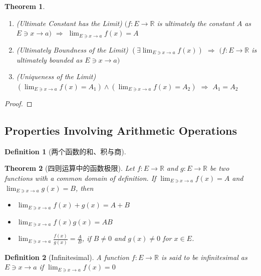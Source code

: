 \documentclass[onecolumn]{ctexart}
\newtheorem{definition}{Definition}
\newtheorem{theorem}{Theorem}
\begin{document}
\begin{theorem}
  \begin{enumerate}
    \item (Ultimate Constant has the Limit) $(f:E \to \mathbb{R}$ is ultimately the constant $A$ as $E 
    \owns x \to a)$ $\Rightarrow$ $\lim_{E \owns x \to a} f(x) = A$
    \item (Ultimately Boundness of the Limit) $(\exists \lim_{E \owns x \to a} f(x))$ $\Rightarrow$ $(f: E \to \mathbb{R}$ is ultimately bounded as $E \owns x \to a)$
    \item (Uniqueness of the Limit) $(\lim_{E \owns x \to a} f(x) = A_1) \wedge (\lim_{E \owns x \to a} f(x) = A_2)$ $\Rightarrow$ $A_1 = A_2$
  \end{enumerate}
\end{theorem}
\begin{proof}
  
\end{proof}

\subsection{Properties Involving Arithmetic Operations}

\begin{definition}[两个函数的和、积与商]
  
\end{definition}

\begin{theorem}[四则运算中的函数极限]
  Let $f:E \to \mathbb{R}$ and $g:E \to \mathbb{R}$ be two functions with a 
  common domain of definition. If $\lim_{E \owns x \to a} f(x) = A$ and 
  $\lim_{E \owns x \to a} g(x) = B$, then
  \begin{itemize}
    \item $\lim_{E \owns x \to a} f(x) + g(x) = A + B$
    \item $\lim_{E \owns x \to a} f(x) g(x) = AB$
    \item $\lim_{E \owns x \to a} \frac{f(x)}{g(x)} = \frac{A}{B}$, if 
    $B \neq 0$ and $g(x) \neq 0$ for $x \in E$.
  \end{itemize}
\end{theorem}

\begin{definition}[Infinitesimal]
  A function $f: E \to \mathbb{R}$ is said to be infinitesimal as $E \owns x \to 
  a$ if $\lim_{E \owns x \to a} f(x) = 0$
\end{definition}
\end{document}

